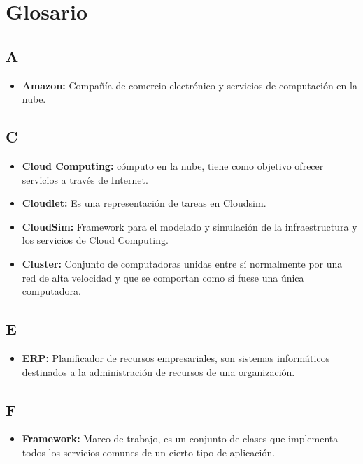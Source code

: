 \chead{}
\rhead{\thepage}

\chapter*{Glosario}
\section*{A}
\begin{itemize}
	\item \textbf{Amazon:} Compañ\'ia de comercio electr\'onico y servicios de computaci\'on en la nube.
	
\end{itemize}

\section*{C}

\begin{itemize}
	\item \textbf{Cloud Computing:} c\'omputo en la nube, tiene como objetivo ofrecer servicios a trav\'es de Internet.
	\item \textbf{Cloudlet:} Es una representaci\'on de tareas en Cloudsim.
	\item \textbf{CloudSim:} Framework para el modelado y simulaci\'on de la infraestructura y los servicios de Cloud Computing.
	\item \textbf{Cluster:} Conjunto de computadoras unidas entre s\'i normalmente por una red de alta velocidad y que se comportan como si fuese una \'unica computadora.
	
		
	
\end{itemize}
\section*{E}
\begin{itemize}
	\item \textbf{ERP:} Planificador de recursos empresariales, son sistemas inform\'aticos destinados a la administraci\'on de recursos de una organizaci\'on.
	
	
\end{itemize}


\section*{F}
\begin{itemize}
	\item \textbf{Framework:} Marco de trabajo, es un conjunto de clases que implementa todos los servicios comunes de un cierto tipo de aplicaci\'on.
\end{itemize}

